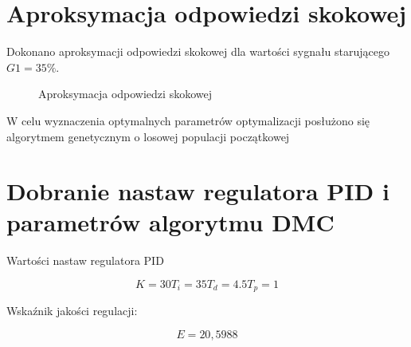 \section{Aproksymacja odpowiedzi skokowej}

Dokonano aproksymacji odpowiedzi skokowej dla wartości sygnału starującego $G1 = 35\%$.

\begin{figure}[H]
\centering

\caption{Aproksymacja odpowiedzi skokowej}
\end{figure}

W celu wyznaczenia optymalnych parametrów optymalizacji posłużono się algorytmem genetycznym o losowej populacji początkowej

\section{Dobranie nastaw regulatora PID i parametrów algorytmu DMC}
 
Wartości nastaw regulatora PID

\begin{equation}
K = 30  T_i = 35  T_d = 4.5  T_p = 1
\end{equation}

Wskaźnik jakości regulacji:

\begin{equation}
E = 20,5988
\end{equation}

